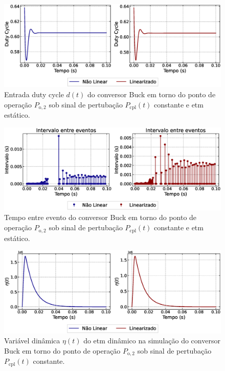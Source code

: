 \begin{figure}[H]
  \centering
  \captionsetup{justification=centering}
  \includegraphics[width=1.\textwidth]{figuras/dynamic-etm/buck/sim1/op2/duty-cycle.eps}
  \caption{Entrada duty cycle $d(t)$ do conversor Buck em torno do ponto de operação $P_{\mathrm{o}, 2}$ sob sinal de pertubação $P_{\mathrm{cpl}}(t)$ constante e \acrshort{etm} estático.}
\end{figure}

\begin{figure}[H]
  \centering
  \captionsetup{justification=centering}
  \includegraphics[width=1.\textwidth]{figuras/dynamic-etm/buck/sim1/op2/inter-event-times.eps}
  \caption{Tempo entre evento do conversor Buck em torno do ponto de operação $P_{\mathrm{o}, 2}$ sob sinal de pertubação $P_{\mathrm{cpl}}(t)$ constante e \acrshort{etm} estático.}
\end{figure}

\begin{figure}[H]
  \centering
  \captionsetup{justification=centering}
  \includegraphics[width=1.\textwidth]{figuras/dynamic-etm/buck/sim1/op2/eta.eps}
  \caption{Variável dinâmica $\eta(t)$ do \acrshort{etm} dinâmico na simulação do conversor Buck em torno do ponto de operação $P_{\mathrm{o}, 2}$ sob sinal de pertubação $P_{\mathrm{cpl}}(t)$ constante.}
\end{figure}

